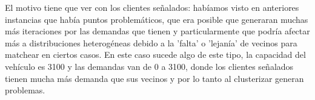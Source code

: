 \documentclass[11pt,a4paper]{article}
\begin{document}
El motivo tiene que ver con los clientes señalados: habíamos visto en anteriores instancias que había puntos problemáticos, que era posible que generaran muchas más iteraciones por las demandas que tienen y particularmente que podría afectar más a distribuciones heterogéneas debido a la 'falta' o 'lejanía' de vecinos para matchear en ciertos casos. En este caso sucede algo de este tipo, la capacidad del vehículo es 3100 y las demandas van de 0 a 3100, donde los clientes señalados tienen mucha más demanda que sus vecinos y por lo tanto al clusterizar generan problemas. 
\end{document}
